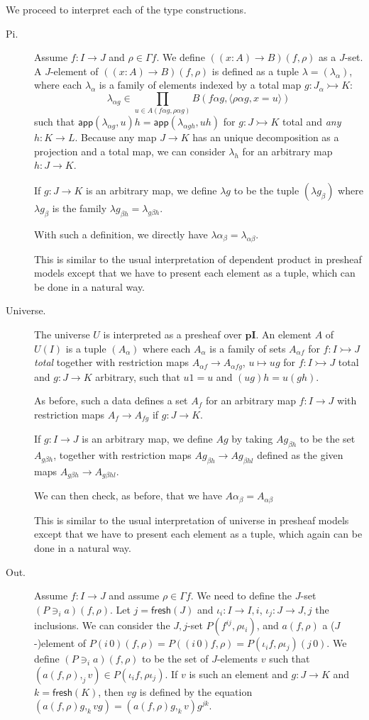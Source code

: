 \documentclass[english]{PaperTools/latex/lipics}
\newcommand\op[1]{∋_{#1}}
\def\pI{\ensuremath{\mathbf{pI}}}
\def\fresh#1{\mathsf{fresh}(#1)}
\def\app#1#2{\mathsf{app}(#1,#2)}
\begin{document}
\bigskip
We proceed to interpret each of the type constructions.
\begin{description}
  \item[\sc Pi.]
    Assume $f : I → J$ and $ρ ∈ Γf$. We define $((x:A) → B)(f,ρ)$ as a $J$-set.
    A $J$-element of $((x:A) → B)(f,ρ)$ is defined as a tuple $λ = (λ_α)$,
    where each $λ_α$ is a family of elements indexed by a total map $g : J_α ↣ K$:
    $$λ_{α g} ∈ \prod_{u ∈ A(fα g,ραg)} B(fαg,⟨ραg,x=u⟩)$$
    such that
    $\app{λ_{αg}}{u} h = \app{λ_{α gh}}{uh}$ for $g : J ↣ K$ total and \emph{any} $h : K → L$.
    Because any map $J → K$ has an unique decomposition as a projection and a total
    map, we can consider $λ_h$ for an arbitrary map $h : J → K$.

    If $g : J → K$ is an arbitrary map, we define $λ g$ to be the tuple
    $(λ g_β)$ where $λ g_β$ is the family $λ g_{βh} = λ_{gβh}$.

    With such a definition, we directly have $λα_{β} = λ_{αβ}$.

    This is similar to the usual interpretation of dependent product in
    presheaf models \citep{Hofmann97syntaxand,bezem2014model} except that we
    have to present each element as a tuple, which can be done in a natural way.


  \item[\sc Universe.]
    The universe $U$ is interpreted as a presheaf over \pI. An element $A$ of
    $U(I)$ is a tuple $(A_α)$ where each $A_α$ is a family of sets
    $A_{α f}$ for $f : I ↣ J$ \emph{total} together with restriction
    maps $A_{α f} → A_{α fg}$, $u ↦ ug$ for $f : I ↣ J$ total
    and $g : J → K$ arbitrary, such that $u1 = u$ and $(ug)h = u(gh)$.

    As before, such a data defines a set $A_f$ for an arbitrary map $f : I → J$
    with restriction maps $A_f → A_{fg}$ if $g : J → K$.

    If $g : I → J$ is an arbitrary map, we define $Ag$ by taking $Ag_{βh}$
    to be the set $A_{gβh}$, together with restriction maps $Ag_{βh} → Ag_{βhl}$
    defined as the given maps $A_{gβh} → A_{gβhl}$.

    We can then check, as before, that we have $Aα_{β} = A_{αβ}$

    This is similar to the usual interpretation of universe in
    presheaf models \citep{Hofmann97syntaxand,bezem2014model} except that we
    have to present each element as a tuple, which again can be done in a natural way.


  \item[\sc Out.]
    Assume $f : I → J$ and assume $ρ ∈ Γf$.  We need to define the $J$-set $(P \op {i} a)(f,ρ)$.
    Let $j = \fresh J$ and $ι_i : I → I,i$, $ι_j : J → J,j$ the inclusions.
    We can consider the $J,j$-set $P(f^{ij},ρι_i)$, and $a(f,ρ)$ a ($J$-)element of
    $P(i\,0)(f,ρ) = P((i\,0)f,ρ) = P(ι_i f,ρι_j)(j\,0)$.
    We define $(P \op {i} a)(f,ρ)$ to be the set of $J$-elements $v$ such that
    $(a(f,ρ),_j v) ∈ P(ι_i f,ρι_j)$. If $v$ is such an element and $g : J → K$
    and $k=\fresh K$, then $vg$ is defined by the equation
    $(a(f,ρ)g,_k vg) = (a(f,ρ)g,_k v) g^{jk}$.



\end{description}
\end{document}
